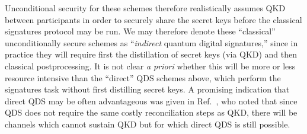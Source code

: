 Unconditional security for these schemes therefore realistically assumes QKD between participants in order to securely share the secret keys before the classical signatures protocol may be run. We may therefore denote these ``classical'' unconditionally secure schemes as ``\emph{indirect} quantum digital signatures,'' since in practice they will require first the distillation of secret keys (via QKD) and then classical postprocessing. It is not clear \emph{a priori} whether this will be more or less resource intensive than the ``direct'' QDS schemes above, which perform the signatures task without first distilling secret keys. A promising indication that direct QDS may be often advantageous was given in Ref.~\cite{Amiri2016}, who noted that since QDS does not require the same costly reconciliation steps as QKD, there will be channels which cannot sustain QKD but for which direct QDS is still possible.


%

